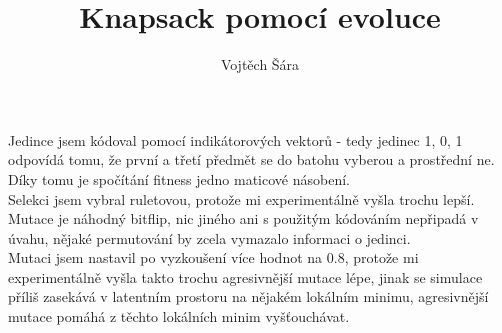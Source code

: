 \documentclass{article}
\title{Knapsack pomocí evoluce}
\author{Vojtěch Šára}
\begin{document}
\maketitle
Jedince jsem kódoval pomocí indikátorových vektorů - tedy jedinec 1, 0, 1 odpovídá tomu, že první a třetí předmět se do batohu
vyberou a prostřední ne. Díky tomu je spočítání fitness jedno maticové násobení.\\
Selekci jsem vybral ruletovou, protože mi experimentálně vyšla trochu lepší.\\
Mutace je náhodný bitflip, nic jiného ani s použitým kódováním nepřipadá v úvahu, nějaké permutování by zcela vymazalo informaci o jedinci.\\
Mutaci jsem nastavil po vyzkoušení více hodnot na 0.8, protože mi experimentálně vyšla
takto trochu agresivnější mutace lépe, jinak se simulace příliš zasekává v latentním prostoru
na nějakém lokálním minimu, agresivnější mutace pomáhá z těchto lokálních minim vyšťouchávat.
\end{document}
